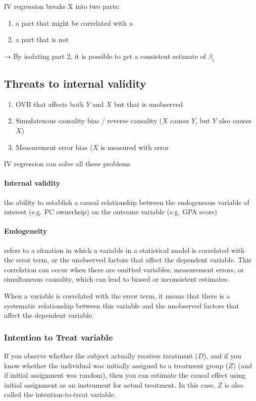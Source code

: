 \documentclass[a3paper, 8pt]{extarticle}
\begin{document}
\begin{multicols*}{5}
IV regression breaks X into two parts: \begin{enumerate}
    \item a part that might be correlated with $u$
    \item a part that is not
\end{enumerate}
→ By isolating part 2, it is possible to get a consistent estimate of $\beta_1$

\subsection{Threats to internal validity}

\begin{enumerate}
    \item OVB that affects both $Y$ and $X$ but that is unobserved
    \item Simulatenous causality bias / reverse causality ($X$ causes $Y$, but $Y$ also causes $X$)
    \item Measurement error bias ($X$ is measured with error
\end{enumerate}
IV regression can solve all these problems

\paragraph{Internal validity} the ability to establish a causal relationship between the endogeneous variable of interest (e.g. PC ownerhsip) on the outcome variable (e.g. GPA score)



\paragraph{Endogeneity}
refers to a situation in which a variable in a statistical model is correlated with the error term, or the unobserved factors that affect the dependent variable. This correlation can occur when there are omitted variables, measurement errors, or simultaneous causality, which can lead to biased or inconsistent estimates.

When a variable is correlated with the error term, it means that there is a systematic relationship between this variable and the unobserved factors that affect the dependent variable. 

\subsubsection{Intention to Treat variable}
If you observe whether the subject actually receives treatment ($D$), and if you know whether the individual was initially assigned to a treatment group ($Z$) (and if initial assignment was random), then you can estimate the causal effect using initial assignment as an instrument for actual treatment. In this case, $Z$ is also called the intention-to-treat variable.


\end{multicols*}
\end{document}
